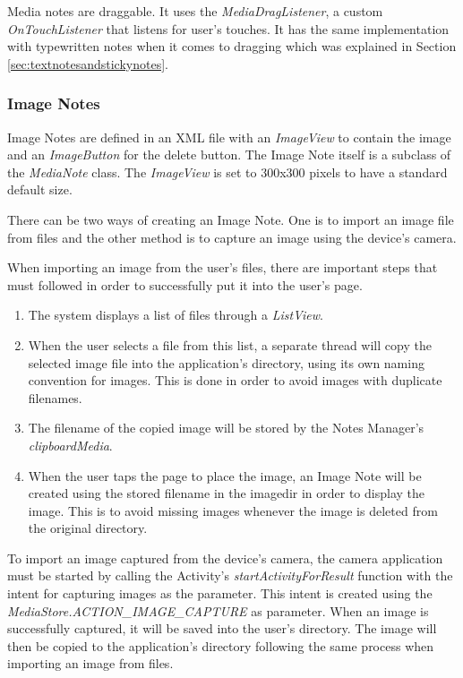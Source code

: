 Media notes are draggable. It uses the \textit{MediaDragListener}, a custom \textit{OnTouchListener} that listens for user's touches. It has the same implementation with typewritten notes when it comes to dragging which was explained in Section \ref{sec:textnotesandstickynotes}.

\subsubsection{Image Notes}
\label{sec:imagenotes}

Image Notes are defined in an XML file with an \textit{ImageView} to contain the image and an \textit{ImageButton} for the delete button. The Image Note itself is a subclass of the \textit{MediaNote} class. The \textit{ImageView} is set to 300x300 pixels to have a standard default size. 

There can be two ways of creating an Image Note. One is to import an image file from files and the other method is to capture an image using the device's camera. 

When importing an image from the user's files, there are important steps that must followed in order to successfully put it into the user's page. 

\begin{enumerate}
\item The system displays a list of files through a \textit{ListView}. 
\item When the user selects a file from this list, a separate thread will copy the selected image file into the application's directory, using its own naming convention for images. This is done in order to avoid images with duplicate filenames. 
\item The filename of the copied image will be stored by the Notes Manager's \textit{clipboardMedia}. 
\item When the user taps the page to place the image, an Image Note will be created using the stored filename in the imagedir in order to display the image. This is to avoid missing images whenever the image is deleted from the original directory. 
\end{enumerate}

To import an image captured from the device's camera, the camera application must be started by calling the Activity's \textit{startActivityForResult} function with the intent for capturing images as the parameter. This intent is created using the \textit{MediaStore.ACTION\_IMAGE\_CAPTURE} as parameter. When an image is successfully captured, it will be saved into the user's directory. The image will then be copied to the application's directory following the same process when importing an image from files.  

